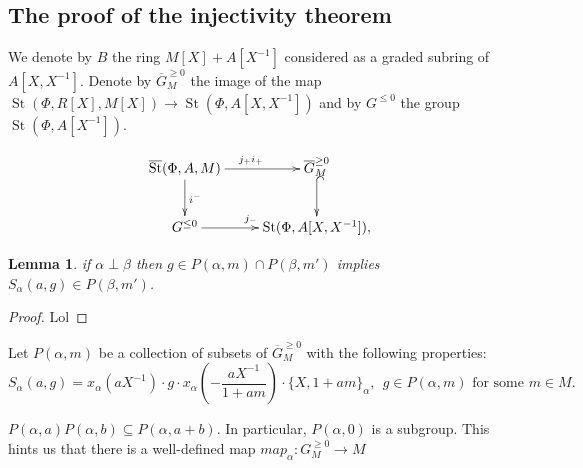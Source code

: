 \documentclass[oneside, 8pt]{amsart}
\newtheorem{corollary}{Corollary}
\newtheorem{lemma}{Lemma}
\theoremstyle{remark}
\theoremstyle{definition}
\DeclareMathOperator{\St}{St}
\numberwithin{equation}{section}
\begin{document}
\begin{comment}
\begin{corollary} Suppose $g$ is an element of $P_\alpha(0) \cap K(A[X], M[X])$. Then $ev^*_{X=0}(S_\alpha(a, g))$ lies in the subgroup $U(Z_+(\alpha), M)$. \end{corollary}
\begin{proof}
 By~\cref{Kgen-strong} and~\cref{P0_normal} $g$ can be expressed as a product of elements 
 $z_\beta(Xf, \xi)$, $\beta\in\Phi\setminus\{\pm \alpha\}$, $c_\gamma(f, X\xi)$ for some $\gamma$ orthogonal to $\alpha$, $x_{-\alpha}(X^2f)$, $x_{\alpha}(f)$.
 
 It remains to notice that the only factors in the right-hand sides of in~\eqref{eq:Zconj1}--\eqref{eq:Zconj3} which do not vanish after evaluation at $X=0$
  are those of the form $x_\beta(m)$ for some $\beta \in Z_+(\alpha)$.
\end{proof}
\end{comment}

  
\subsection{The proof of the injectivity theorem}
We denote by $B$ the ring $M[X] + A[X^{-1}]$ considered as a graded subring of $A[X, X^{-1}]$.
Denote by $\overline{G}^{\geq 0}_M$ the image of the map $\St(\Phi, R[X], M[X]) \to \St(\Phi, A[X, X^{-1}])$ and by
 $G^{\leq 0}$ the group $\St(\Phi, A[X^{-1}])$.

\[ \xymatrix{ \overline{\St}(\Phi, A, M) \ar[r]^{j_+i_+} \ar[d]^{i^-} & \overline{G}_M^{\geq 0} \ar@{^{(}->}[d] \\
              G^{\leq 0} \ar[r]^{j_-} & \St(\Phi, A[X, X^{-1}]), } \] 

\begin{lemma} if $\alpha \perp \beta$ then $g \in P(\alpha, m) \cap P(\beta, m')$ implies $S_\alpha(a, g) \in P(\beta, m')$. \end{lemma}
\begin{proof}
 Lol
\end{proof}

Let $P(\alpha, m)$ be a collection of subsets of $\overline{G}^{\geq 0}_M$ with the following properties:
\[ S_\alpha(a, g) = x_\alpha(aX^{-1})\cdot g \cdot x_\alpha\left(-\frac{aX^{-1}}{1 + am}\right) \cdot \{X, 1+ am\}_\alpha,\ \ g \in P(\alpha, m)\text{ for some $m \in M$}.\]

$P(\alpha, a) P(\alpha, b) \subseteq P(\alpha, a + b)$.
In particular, $P(\alpha, 0)$ is a subgroup.
This hints us that there is a well-defined map $map_\alpha \colon G_M^{\geq 0} \to M$
\end{document}
